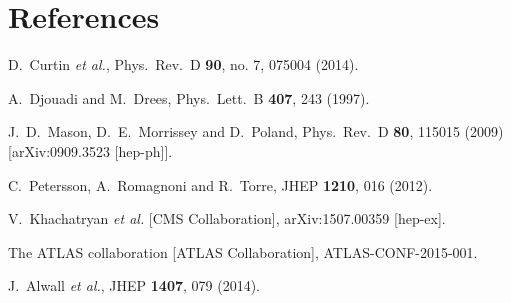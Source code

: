 \documentclass[11pt]{article}
\begin{document}
	\clearpage
	\newpage
	\section{References}

\begin{thebibliography}{99}

  D.~Curtin {\it et al.},
  Phys.\ Rev.\ D {\bf 90}, no. 7, 075004 (2014).


  A.~Djouadi and M.~Drees,
  Phys.\ Lett.\ B {\bf 407}, 243 (1997).


  J.~D.~Mason, D.~E.~Morrissey and D.~Poland,
  Phys.\ Rev.\ D {\bf 80}, 115015 (2009)
  [arXiv:0909.3523 [hep-ph]].
 
  C.~Petersson, A.~Romagnoni and R.~Torre,
  JHEP {\bf 1210}, 016 (2012).


  V.~Khachatryan {\it et al.} [CMS Collaboration],
  arXiv:1507.00359 [hep-ex].
  
  The ATLAS collaboration [ATLAS Collaboration],
  ATLAS-CONF-2015-001.
  
  J.~Alwall {\it et al.},
  JHEP {\bf 1407}, 079 (2014).


\end{thebibliography}
\end{document}
